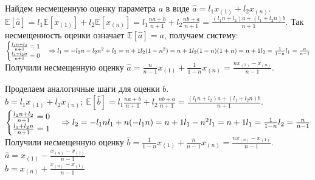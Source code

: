 \documentclass[a4paper]{article}
\theoremstyle{definition}
\begin{document}
    Найдем несмещенную оценку параметра $a$ в виде $\hat{a} = l_1x_{(1)} + l_2x_{(n)}$. $\mathbb{E}[\hat{a}] = l_1\mathbb{E}[x_{(1)}] + l_2\mathbb{E}[x_{(n)}] = 
    l_1\frac{na + b}{n + 1} + l_2\frac{nb + a}{n + 1} = \frac{(l_1n + l_2)a + (l_1 + l_2n)b}{n+1}$. Так несмещенность оценки означает $\mathbb{E}[\hat{a}] = a$, 
    получаем систему: \\
    $
    \begin{cases}
        \frac{l_1n + l_2}{n + 1} = 1 \\
        \frac{l_1 + l_2n}{n + 1} = 0
    \end{cases}
    \Rightarrow l_1 = -l_2n \\
    -l_2n^2 + l_2 = n + 1 \\
    l_2(1 - n^2) = n + 1 \\
    l_2(1 - n)(1 + n) = n + 1\\
    l_2 = \frac{1}{1 - n} \\
    l_1 = \frac{n}{n - 1}
    $
    Получили несмещенную оценку $\hat{a} = \frac{n}{n - 1}x_{(1)} + \frac{1}{1 - n}x_{(n)} = \frac{nx_{(1)} - x_{(n)}}{n - 1}$.

    Проделаем аналогичные шаги для оценки $b$. \\
    $\hat{b} = l_1x_{(1)} + l_2x_{(n)}; \ \mathbb{E}[\hat{b}] = l_1\frac{na + b}{n + 1} + l_2\frac{nb + a}{n + 1} = \frac{(l_1n + l_2)a + (l_1 + l_2n)b}{n+1} $. \\
    $
    \begin{cases}
        \frac{l_1n + l_2}{n + 1} = 0 \\
        \frac{l_1 + l_2n}{n + 1} = 1
    \end{cases} 
    \Rightarrow
    l_2 = -l_1n \\
    l_1 + n(-l_1n) = n + 1 \\ 
    l_1 - n^2l_1 = n + 1 \\
    l_1 = \frac{1}{1 - n} \\
    l_2 = \frac{n}{n - 1}
    $
    Получили несмещенную оценку $\hat{b} = \frac{1}{1 - n}x_{(1)} + \frac{n}{n - 1}x_{(n)} = \frac{nx_{(n)} - x_{(1)}}{n - 1}$. \\

    $\hat{a} = x_{(1)} - \frac{x_{(n)} - x_{(1)}}{n - 1}$ \\
    $\hat{b} = x_{(n)} + \frac{x_{(n)} - x_{(1)}}{n - 1}$
\end{document}
